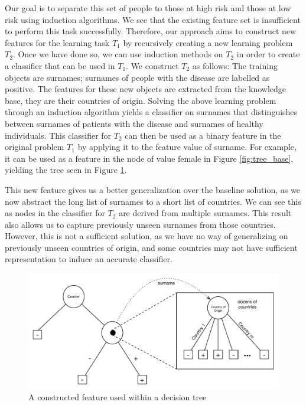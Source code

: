 \documentclass[twoside,11pt]{article}
\theoremstyle{definition}
\begin{document}
 Our goal is to separate this set of people to those at high risk and those at low risk using induction algorithms. We see that the existing feature set is insufficient to perform this task successfully. Therefore, our approach aims to construct new features for the learning task $T_1$ by recursively creating a new learning problem $T_2$. Once we have done so, we can use induction methods on $T_2$ in order to create a classifier that can be used in $T_1$. We construct $T_2$ as follows: 
  The training objects are surnames; surnames of people with the disease are labelled as positive. The features for these new objects are extracted from the knowledge base, they are their countries of origin.
Solving the above learning problem through an induction algorithm yields a classifier on surnames that distinguishes between surnames of patients with the disease and surnames of healthy individuals. This classifier for $T_2$ can then be used as a binary feature in the original problem $T_1$ by applying it to the feature value of surname. For example, it can be used as a feature in the node of value female in Figure \ref{fig:tree_base}, yielding the tree seen in Figure \ref{fig:lvl1_tree}. 

This new feature gives us a better generalization over the baseline solution, as we now abstract the long list of surnames to a short list of countries. We can see this as nodes in the classifier for $T_2$ are derived from multiple surnames. This result also allows us to capture previously unseen surnames from those countries. However, this is not a sufficient solution, as we have no way of generalizing on previously unseen countries of origin, and some countries may not have sufficient representation to induce an accurate classifier. %


\begin{figure}
	\centering
	\includegraphics[width=\linewidth]{fig2.pdf}
	\caption{A constructed feature used within a decision tree}
	\label{fig:lvl1_tree}
\end{figure}
\end{document}
